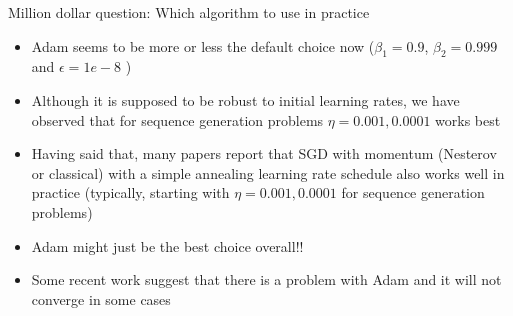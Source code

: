 \begin{frame}
	\begin{overlayarea}{\textwidth}{\textheight}
		\begin{block}{Million dollar question: Which algorithm to use in practice}
			\begin{itemize}\justifying
				\item<1-> Adam seems to be more or less the default choice now ($\beta_1=0.9$, $\beta_2=0.999$ and $\epsilon=1e-8$ )
				\item<2-> Although it is supposed to be robust to initial learning rates, we have observed that for sequence generation problems $\eta = {0.001, 0.0001}$ works best
				\item<3-> Having said that, many papers report that SGD with momentum (Nesterov or classical) with a simple annealing learning rate schedule also works well in practice  (typically, starting with $\eta = {0.001, 0.0001}$ for sequence generation problems) 
				\item<4-> Adam might just be the best choice overall!!
				\item<5-> Some recent work suggest that there is a problem with Adam and it will not converge in some cases
			\end{itemize}
		\end{block}
	\end{overlayarea}
\end{frame}

\begin{frame}
\end{frame}

\begin{frame}
\end{frame}
